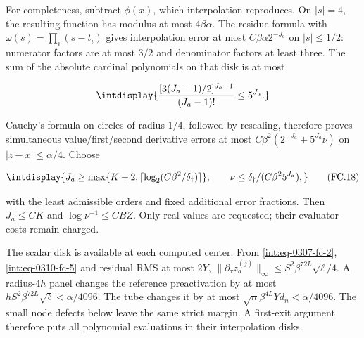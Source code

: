 
For completeness, subtract \(\phi(x)\), which interpolation reproduces. On \(|s|=4\), the resulting function has modulus at most \(4\beta\alpha\). The residue formula with \(\omega(s)=\prod_i(s-t_i)\) gives interpolation error at most \(C\beta\alpha2^{-J_a}\) on \(|s|\le1/2\): numerator factors are at most \(3/2\) and denominator factors at least three. The sum of the absolute cardinal polynomials on that disk is at most


\begingroup\renewcommand{\theHequation}{intdisplay.715}
\begin{equation*}
\intdisplay{
\frac{[3(J_a-1)/2]^{J_a-1}}{(J_a-1)!}\le5^{J_a}.
}
\end{equation*}
\endgroup


Cauchy's formula on circles of radius \(1/4\), followed by rescaling, therefore proves simultaneous value/first/second derivative errors at most \(C\beta^2(2^{-J_a}+5^{J_a}\nu)\) on \(|z-x|\le\alpha/4\). Choose


\begingroup\renewcommand{\theHequation}{intdisplay.716}
\begin{equation}
\intdisplay{
J_a\ge\max\{K+2,\lceil\log_2(C\beta^2/\delta_\dagger)\rceil\},
\qquad \nu\le\delta_\dagger/(C\beta^2 5^{J_a}),
}
\tag{FC.18}
\label{int:eq-0323-fc-18}
\end{equation}
\endgroup


with the least admissible orders and fixed additional error fractions. Then \(J_a\le CK\) and \(\log\nu^{-1}\le CBZ\). Only real values are requested; their evaluator costs remain charged.



The scalar disk is available at each computed center. From \eqref{int:eq-0307-fc-2}, \eqref{int:eq-0310-fc-5} and residual RMS at most \(2Y\), \(\|\partial_\tau z_a^{(j)}\|_\infty\le S^2\beta^{72L}\sqrt\ell/4\). A radius-\(4h\) panel changes the reference preactivation by at most \(hS^2\beta^{72L}\sqrt\ell< \alpha/4096\). The tube changes it by at most \(\sqrt n\beta^{4L}Yd_n<\alpha/4096\). The small node defects below leave the same strict margin. A first-exit argument therefore puts all polynomial evaluations in their interpolation disks.




